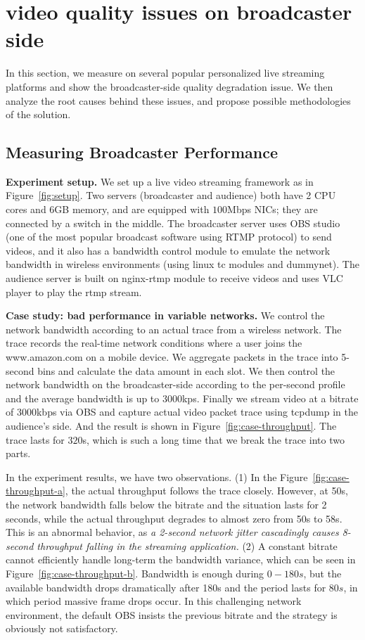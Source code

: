 \section{video quality issues on broadcaster side}

In this section, we measure on several popular personalized live streaming platforms and show the broadcaster-side quality degradation issue. We then analyze the root causes behind these issues, and propose possible methodologies of the solution.

\subsection{Measuring Broadcaster Performance}

\textbf{Experiment setup.} We set up a live video streaming framework as in Figure~\ref{fig:setup}. Two servers (broadcaster and audience) both have 2 CPU cores and 6GB memory, and are equipped with $100$Mbps NICs; they are connected by a switch in the middle.
The broadcaster server uses OBS studio\cite{OBS} (one of the most popular broadcast software using RTMP protocol) to send videos, and it also has a bandwidth control module to emulate the network bandwidth in wireless environments (using linux tc modules and dummynet\cite{dummynet}). The audience server is built on nginx-rtmp module to receive videos and uses VLC player to play the rtmp stream.


\textbf{Case study: bad performance in variable networks.} We control the network bandwidth according to an actual trace from a wireless network. The trace records the real-time network conditions where a user joins the www.amazon.com on a mobile device. We aggregate packets in the trace into 5-second bins and calculate the data amount in each slot. We then control the network bandwidth on the broadcaster-side according to the per-second profile and the average bandwidth is up to $3000$kps. Finally we stream video at a bitrate of $3000$kbps via OBS and capture actual video packet trace using tcpdump in the audience's side. And the result is shown in Figure~\ref{fig:case-throughput}.  The trace lasts for $320$s, which is such a long time that we break the trace into two parts.

In the experiment results, we have two observations. (1) In the Figure~\ref{fig:case-throughput-a}, the actual throughput follows the trace closely. However, at 50s, the network bandwidth falls below the bitrate and the situation lasts for 2 seconds, while the actual throughput degrades to almost zero from 50s to 58s. This is an abnormal behavior, as \textit{a 2-second network jitter cascadingly causes 8-second throughput falling in the streaming application.} (2) A constant bitrate cannot efficiently handle long-term the bandwidth variance, which can be seen in Figure~\ref{fig:case-throughput-b}. Bandwidth is enough during $0-180s$, but the available bandwidth drops dramatically after 180s and the period lasts for $80s$, in which period massive frame drops occur. In this challenging network environment, the default OBS insists the previous bitrate and the strategy is obviously not satisfactory.

